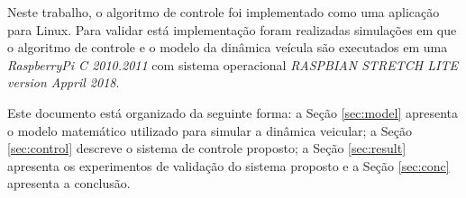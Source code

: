 Neste trabalho, o algoritmo de controle foi implementado como uma aplicação para
Linux. Para validar está implementação foram realizadas simulações em que
o algoritmo de controle e o modelo da dinâmica veícula são executados em uma
\emph{RaspberryPi C 2010.2011} com sistema operacional 
\emph{RASPBIAN STRETCH LITE version Appril 2018}.

Este documento está organizado da seguinte forma: a Seção
\ref{sec:model} apresenta o modelo matemático utilizado para simular a dinâmica
veicular; a Seção \ref{sec:control} descreve o sistema de controle proposto;
a Seção \ref{sec:result} apresenta os experimentos de validação do sistema
proposto e a Seção \ref{sec:conc} apresenta a conclusão.